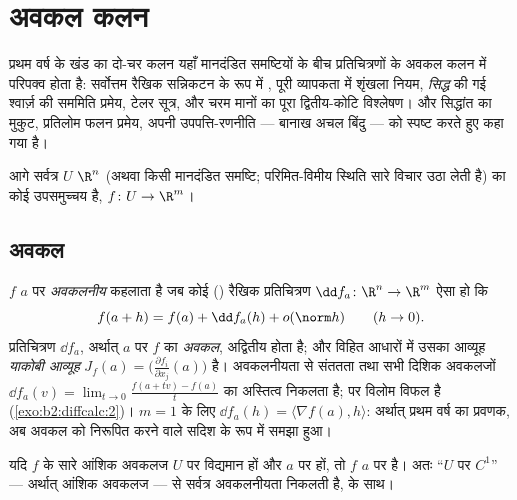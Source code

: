 \chapter{अवकल कलन}\label{ch:b2:diffcalc}

प्रथम वर्ष के खंड का दो-चर कलन यहाँ मानदंडित समष्टियों के बीच प्रतिचित्रणों
के अवकल कलन में परिपक्व होता है: सर्वोत्तम रैखिक सन्निकटन के रूप में
\emph{}, पूरी व्यापकता में शृंखला नियम, \emph{सिद्ध} की गई श्वार्ज़ की
सममिति प्रमेय, टेलर सूत्र, और चरम मानों का पूरा द्वितीय-कोटि विश्लेषण। और
सिद्धांत का मुकुट, प्रतिलोम फलन प्रमेय, अपनी उपपत्ति-रणनीति --- बानाख अचल
बिंदु --- को स्पष्ट करते हुए कहा गया है।

आगे सर्वत्र $U$ $\R^n$ (अथवा किसी मानदंडित समष्टि; परिमित-विमीय स्थिति सारे
विचार उठा लेती है) का कोई  उपसमुच्चय है, $f \colon U \to
\R^m$।

\section{अवकल}

\begin{definition}\label{def:b2:diffcalc:differential}
$f$ $a$ पर \emph{अवकलनीय} कहलाता है जब कोई () रैखिक
प्रतिचित्रण $\dd f_a \colon \R^n \to \R^m$ ऐसा हो कि
\[
f(a + h) = f(a) + \dd f_a(h) + o(\norm h)
\qquad (h \to 0).
\]
प्रतिचित्रण $\dd f_a$, अर्थात् $a$ पर $f$ का \emph{अवकल}, अद्वितीय
होता है; और विहित आधारों में उसका आव्यूह \emph{याकोबी आव्यूह} $J_f(a) =
\bigl(\frac{\partial f_i}{\partial x_j}(a)\bigr)$ है। अवकलनीयता से संततता तथा सभी दिशिक अवकलजों $\dd f_a(v) = \lim_{t\to0}\frac{f(a + tv)
- f(a)}{t}$ का अस्तित्व
निकलता है; पर विलोम विफल है (\cref{exo:b2:diffcalc:2})। $m = 1$ के लिए $\dd f_a(h) = \langle
\nabla f(a), h\rangle$: अर्थात् प्रथम वर्ष
का प्रवणक, अब अवकल को निरूपित करने वाले सदिश के रूप में समझा हुआ।
\end{definition}

\begin{theorem}[$C^1$ कसौटी]\label{thm:b2:diffcalc:c1}
यदि $f$ के सारे आंशिक अवकलज $U$ पर विद्यमान हों और $a$ पर  हों, तो
$f$ $a$ पर  है। अतः ``$U$ पर $C^1$'' --- अर्थात्  आंशिक अवकलज ---
से सर्वत्र अवकलनीयता निकलती है,   के साथ।
\end{theorem}

